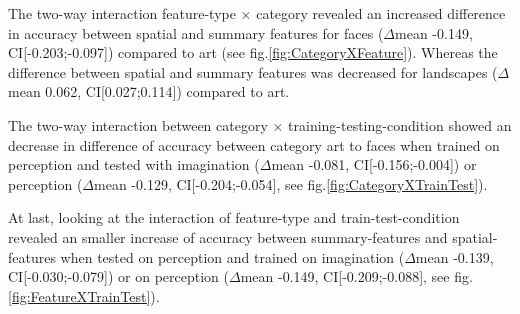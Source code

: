 \documentclass[a4paper,man,natbib,floatsintext]{apa6}
\begin{document}
The two-way interaction feature-type $\times$ category revealed an increased difference in accuracy between spatial and summary features for faces ($\Delta$mean -0.149, CI[-0.203;-0.097]) compared to art (see fig.\ref{fig:CategoryXFeature}). 
Whereas the difference between spatial and summary features was decreased for landscapes ($\Delta$mean 0.062, CI[0.027;0.114]) compared to art. 

The two-way interaction between category $\times$ training-testing-condition showed an decrease in difference of accuracy between category art to faces when trained on perception and tested with imagination ($\Delta$mean -0.081, CI[-0.156;-0.004]) or perception ($\Delta$mean -0.129, CI[-0.204;-0.054], see fig.\ref{fig:CategoryXTrainTest}). 

At last, looking at the interaction of feature-type and train-test-condition revealed an smaller increase of accuracy between summary-features and spatial-features when tested on perception and trained on imagination ($\Delta$mean -0.139, CI[-0.030;-0.079]) or on perception ($\Delta$mean -0.149, CI[-0.209;-0.088], see fig.\ref{fig:FeatureXTrainTest}).


\end{document}
